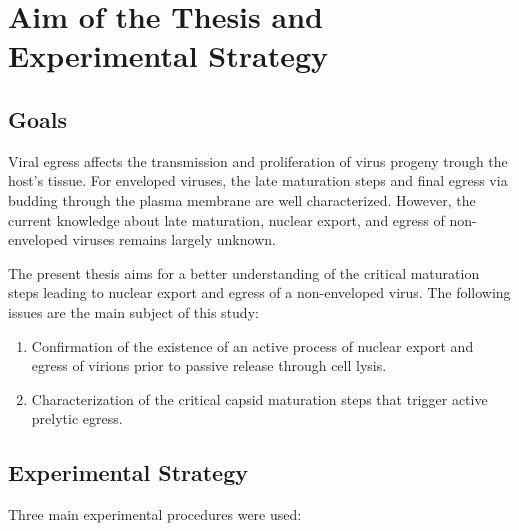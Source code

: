 
\chapter{Aim of the Thesis and Experimental Strategy} %

\label{Aim} 


\graphicspath{{./Pictures/}}


\section{Goals}

Viral egress affects the transmission and proliferation of virus progeny trough the host's tissue. For enveloped viruses, the late maturation steps and final egress via budding through the plasma membrane are well characterized. However, the current knowledge about late maturation, nuclear export, and egress of non-enveloped viruses remains largely unknown. 

The present thesis aims for a better understanding of the critical maturation steps leading to nuclear export and egress of a non-enveloped virus. The following issues are the main subject of this study: 




\medskip

\begin{enumerate}
\item Confirmation of the existence of an active process of nuclear export and egress of virions prior to passive release through cell lysis. 
\item Characterization of the critical capsid maturation steps that trigger active prelytic egress.
\end{enumerate}

\bigskip
\bigskip

\section{Experimental Strategy}

Three main experimental procedures were used:

\medskip


